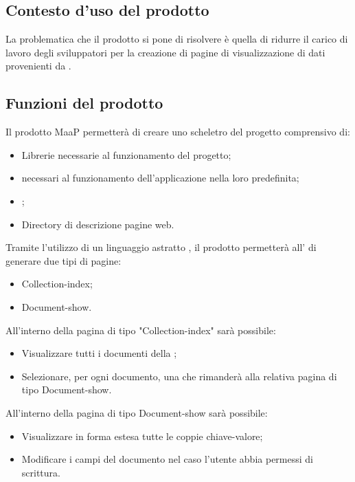 \subsection{Contesto d'uso del prodotto} %
\label{2.1}
La problematica che il prodotto si pone di risolvere è quella di ridurre il carico di lavoro degli sviluppatori per la creazione di pagine  di visualizzazione di dati provenienti da .

\subsection{Funzioni del prodotto} %
\label{2.2}
Il prodotto MaaP permetterà di creare uno scheletro del progetto comprensivo di:
\begin{itemize}
\item Librerie necessarie al funzionamento del progetto;
\item {} necessari al funzionamento dell'applicazione nella loro  predefinita;
\item {};
\item Directory di descrizione pagine web.
\end{itemize}
Tramite l'utilizzo di un linguaggio astratto , il prodotto permetterà all' di generare due tipi di pagine:
\begin{itemize}
\item Collection-index;
\item Document-show.
\end{itemize}

All'interno della pagina di tipo "Collection-index" sarà possibile:
\begin{itemize}
\item Visualizzare tutti i documenti della ;
\item Selezionare, per ogni documento, una  che rimanderà alla relativa pagina di tipo Document-show.
\end{itemize}

All'interno della pagina di tipo Document-show sarà possibile:
\begin{itemize}
\item Visualizzare in forma estesa tutte le coppie chiave-valore;
\item Modificare i campi del documento nel caso l'utente abbia permessi di scrittura.
\end{itemize}

